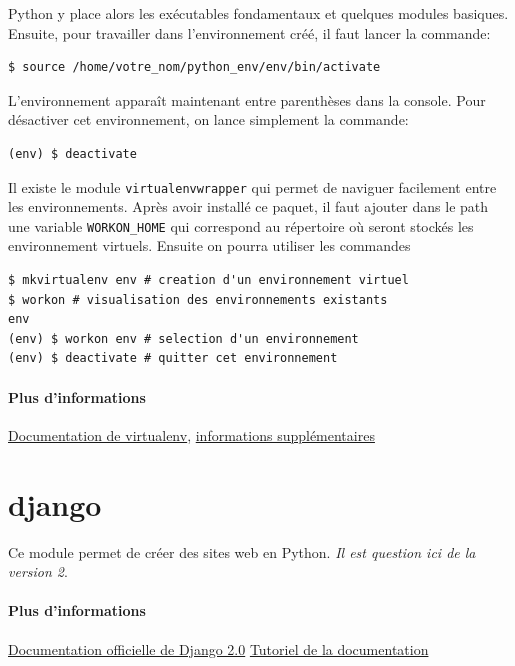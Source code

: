 \documentclass[a4paper, 10pt]{article}
\begin{document}
Python y place alors les exécutables fondamentaux et quelques modules basiques. Ensuite, pour travailler dans l'environnement créé, il faut lancer la commande:
\begin{verbatim}
$ source /home/votre_nom/python_env/env/bin/activate
\end{verbatim}

L'environnement apparaît maintenant entre parenthèses dans la console. Pour désactiver cet environnement, on lance simplement la commande:

\begin{verbatim}
(env) $ deactivate
\end{verbatim}

Il existe le module \texttt{virtualenvwrapper} qui permet de naviguer facilement entre les environnements. Après avoir installé ce paquet, il faut ajouter dans le path une variable \texttt{WORKON_HOME} qui correspond au répertoire où seront stockés les environnement virtuels. Ensuite on pourra utiliser les commandes

\begin{verbatim}
$ mkvirtualenv env # creation d'un environnement virtuel
$ workon # visualisation des environnements existants
env
(env) $ workon env # selection d'un environnement
(env) $ deactivate # quitter cet environnement
\end{verbatim}

\paragraph{Plus d'informations} \href{https://virtualenv.pypa.io/en/stable/}{Documentation de virtualenv}, \href{http://sametmax.com/les-environnement-virtuels-python-virtualenv-et-virtualenvwrapper/}{informations supplémentaires}


\section{django}
Ce  module permet de créer des sites web en Python. \emph{Il est question ici de la version 2}.
\paragraph{Plus d'informations} \href{https://docs.djangoproject.com/fr/2.0/}{Documentation officielle de Django 2.0} \href{https://docs.djangoproject.com/fr/2.0/intro/}{Tutoriel de la documentation}
\end{document}
